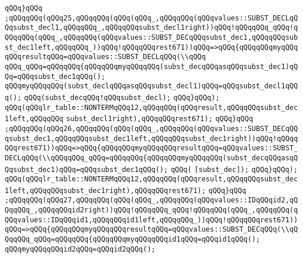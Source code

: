 \verb|qQQq}qQQq|\newline
\verb|;qQQqqQQq(qQQq25,qQQqqQQq(qQQq(qQQq_,qQQqqQQq(qQQqvalues::SUBST_DECLqQQqsubst_decl1,qQQqqQQq_,qQQqqQQqsubst_decl1right))qQQq!qQQqqQQq_qQQq!qQQqqQQq(qQQq_,qQQqqQQq(qQQqvalues::SUBST_DECqQQqsubst_dec1,qQQqqQQqsubst_dec1left,qQQqqQQq_))qQQq!qQQqqQQqrest671))qQQq=>qQQq{qQQqqQQqmyqQQqqQQqresultqQQq=qQQqvalues::SUBST_DECLqQQq(\\qQQq|\newline
\verb|qQQq_qQQq=qQQqqQQq{qQQqqQQqmyqQQqqQQq(subst_decqQQqasqQQqsubst_dec1)qQQq=qQQqsubst_dec1qQQq();|\newline
\verb|qQQqmyqQQqqQQq(subst_declqQQqasqQQqsubst_decl1)qQQq=qQQqsubst_decl1qQQq();|\newline
\verb|qQQq(subst_decqQQq!qQQqsubst_decl);|\newline
\verb|qQQq}qQQq);|\newline
\verb|qQQq(qQQqlr_table::NONTERMqQQq12,qQQqqQQq(qQQqresult,qQQqqQQqsubst_dec1left,qQQqqQQq|\newline
\verb|subst_decl1right),qQQqqQQqrest671);|\newline
\verb|qQQq}qQQq|\newline
\verb|;qQQqqQQq(qQQq26,qQQqqQQq(qQQq(qQQq_,qQQqqQQq(qQQqvalues::SUBST_DECqQQqsubst_dec1,qQQqqQQqsubst_dec1left,qQQqqQQqsubst_dec1right))qQQq!qQQqqQQqrest671))qQQq=>qQQq{qQQqqQQqmyqQQqqQQqresultqQQq=qQQqvalues::SUBST_DECLqQQq(\\qQQqqQQq_qQQq=qQQqqQQq{qQQqqQQqmyqQQqqQQq(subst_decqQQqasqQQqsubst_dec1)qQQq=qQQqsubst_dec1qQQq();|\newline
\verb|qQQq(|\newline
\verb|[subst_dec]);|\newline
\verb|qQQq}qQQq);|\newline
\verb|qQQq(qQQqlr_table::NONTERMqQQq12,qQQqqQQq(qQQqresult,qQQqqQQqsubst_dec1left,qQQqqQQqsubst_dec1right),qQQqqQQqrest671);|\newline
\verb|qQQq}qQQq|\newline
\verb|;qQQqqQQq(qQQq27,qQQqqQQq(qQQq(qQQq_,qQQqqQQq(qQQqvalues::IDqQQqid2,qQQqqQQq_,qQQqqQQqid2right))qQQq!qQQqqQQq_qQQq!qQQqqQQq(qQQq_,qQQqqQQq(qQQqvalues::IDqQQqid1,qQQqqQQqid1left,qQQqqQQq_))qQQq!qQQqqQQqrest671))qQQq=>qQQq{qQQqqQQqmyqQQqqQQqresultqQQq=qQQqvalues::SUBST_DECqQQq(\\qQQqqQQq_qQQq=qQQqqQQq{qQQqqQQqmyqQQqqQQqid1qQQq=qQQqid1qQQq();|\newline
\verb|qQQqmyqQQqqQQqid2qQQq=qQQqid2qQQq();|\newline
